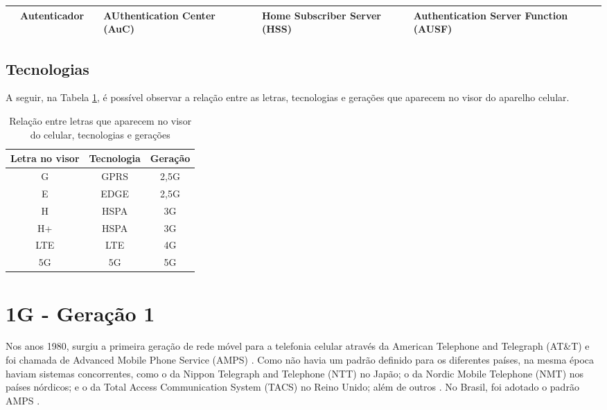\documentclass[11pt,oneside,a4paper]{abntex2}
\begin{document}
\begin{center}
\begin{longtable}{|m{1.5cm}|m{2.5cm}|l|m{2cm}|m{2cm}|m{2cm}|m{2cm}|}
                        & Autenticador                           &    & AUthentication Center (AuC)              &                                                                                             & Home Subscriber Server (HSS)                                    & Authentication Server Function (AUSF)                                                                                                       \\ \hline
\end{longtable}
\end{center}

\subsection*{Tecnologias}

A seguir, na Tabela \ref{sopa-letrinhas-2}, é possível observar a relação entre as letras, tecnologias e gerações que aparecem no visor do aparelho celular.

\begin{table}
\caption{Relação entre letras que aparecem no visor do celular, tecnologias e gerações}
\label{sopa-letrinhas-2}
\begin{center}
\begin{tabular}{||c||c||c||}
	\hline
	\textbf{Letra no visor} & \textbf{Tecnologia} & \textbf{Geração} \\
	\hline
	\hline
	G & GPRS & 2,5G \\
	\hline
	E & EDGE & 2,5G \\
	\hline
	H & HSPA & 3G \\
	\hline
	H+ & HSPA & 3G \\
	\hline
	LTE & LTE & 4G \\
	\hline
	5G & 5G & 5G \\
	\hline
\end{tabular}
\end{center}
\end{table}

\section*{1G - Geração 1}
\label{1g}

Nos anos 1980, surgiu a primeira geração de rede móvel para a telefonia celular através da American Telephone and Telegraph (AT\&T) e foi chamada de Advanced Mobile Phone Service (AMPS) \cite{tcc1}. Como não havia um padrão definido para os diferentes países, na mesma época haviam sistemas concorrentes, como o da Nippon Telegraph and Telephone (NTT) no Japão; o da Nordic Mobile Telephone (NMT) nos países nórdicos; e o da Total Access Communication System (TACS) no Reino Unido; além de outros \cite{wiki-1g-br, wiki-1g-en}. No Brasil, foi adotado o padrão AMPS \cite{tcc2}.
\end{document}
